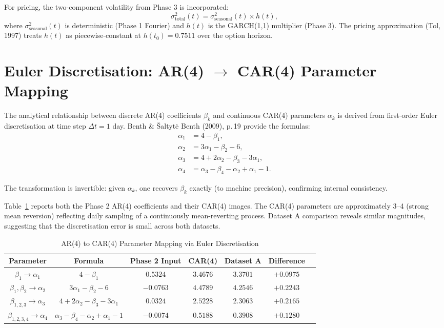 \documentclass[11pt, a4paper, twoside]{article}
\begin{document}
For pricing, the two-component volatility from Phase 3 is incorporated:
\begin{equation}
\sigma^2_{\text{total}}(t) = \sigma^2_{\text{seasonal}}(t) \times h(t),
\end{equation}
where $\sigma^2_{\text{seasonal}}(t)$ is deterministic (Phase 1 Fourier) and $h(t)$ is the GARCH(1,1) multiplier (Phase 3). The pricing approximation (Tol, 1997) treats $h(t)$ as piecewise-constant at $h(t_0) = 0.7511$ over the option horizon.

\section{Euler Discretisation: AR(4) $\to$ CAR(4) Parameter Mapping}

The analytical relationship between discrete AR(4) coefficients $\beta_k$ and continuous CAR(4) parameters $\alpha_k$ is derived from first-order Euler discretisation at time step $\Delta t = 1$ day. Benth \& Šaltytė Benth (2009), p.\,19 provide the formulas:
\begin{align}
\alpha_1 &= 4 - \beta_1, \\
\alpha_2 &= 3\alpha_1 - \beta_2 - 6, \\
\alpha_3 &= 4 + 2\alpha_2 - \beta_3 - 3\alpha_1, \\
\alpha_4 &= \alpha_3 - \beta_4 - \alpha_2 + \alpha_1 - 1.
\end{align}

The transformation is invertible: given $\alpha_k$, one recovers $\beta_k$ exactly (to machine precision), confirming internal consistency.

Table~\ref{tbl:ar4_to_car4} reports both the Phase 2 AR(4) coefficients and their CAR(4) images. The CAR(4) parameters are approximately 3--4 (strong mean reversion) reflecting daily sampling of a continuously mean-reverting process. Dataset A comparison reveals similar magnitudes, suggesting that the discretisation error is small across both datasets.

\begin{table}[ht]
\centering
\caption{AR(4) to CAR(4) Parameter Mapping via Euler Discretisation}
\label{tbl:ar4_to_car4}
\small
\begin{tabularx}{\textwidth}{c|cc|cccc}
\toprule
\textbf{Parameter} & \textbf{Formula} & \textbf{Phase 2 Input} & \textbf{CAR(4)} & \textbf{Dataset A} & \textbf{Difference} \\
\midrule
$\beta_1 \to \alpha_1$ & $4 - \beta_1$ & $0.5324$ & $3.4676$ & $3.3701$ & $+0.0975$ \\
$\beta_1, \beta_2 \to \alpha_2$ & $3\alpha_1 - \beta_2 - 6$ & $-0.0763$ & $4.4789$ & $4.2546$ & $+0.2243$ \\
$\beta_{1,2,3} \to \alpha_3$ & $4 + 2\alpha_2 - \beta_3 - 3\alpha_1$ & $0.0324$ & $2.5228$ & $2.3063$ & $+0.2165$ \\
$\beta_{1,2,3,4} \to \alpha_4$ & $\alpha_3 - \beta_4 - \alpha_2 + \alpha_1 - 1$ & $-0.0074$ & $0.5188$ & $0.3908$ & $+0.1280$ \\
\bottomrule
\end{tabularx}
\end{table}
\end{document}
